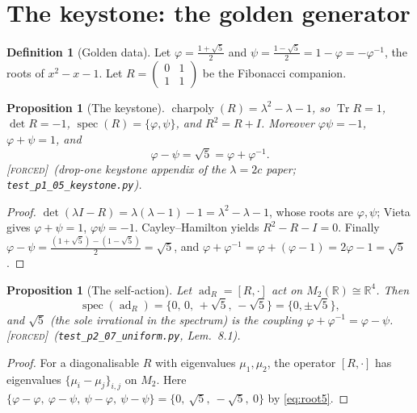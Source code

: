 \documentclass[11pt]{article}
\theoremstyle{plain}
\newtheorem{proposition}[theorem]{Proposition}
\theoremstyle{definition}
\newtheorem{definition}[theorem]{Definition}
\theoremstyle{remark}
\newcommand{\forced}{\textup{\textcolor{forcedc}{\textsc{[forced]}}}}
\newcommand{\R}{\mathbb{R}}
\newcommand{\tr}{\operatorname{Tr}}
\newcommand{\adR}{\operatorname{ad}_R}
\begin{document}
\section{The keystone: the golden generator}\label{sec:keystone}

\begin{definition}[Golden data]\label{def:golden}
Let $\varphi=\tfrac{1+\sqrt5}{2}$ and $\psi=\tfrac{1-\sqrt5}{2}=1-\varphi=-\varphi^{-1}$, the roots of
$x^2-x-1$. Let $R=\left(\begin{smallmatrix}0&1\\1&1\end{smallmatrix}\right)$ be the Fibonacci companion.
\end{definition}

\begin{proposition}[The keystone]\label{prop:keystone}
$\operatorname{charpoly}(R)=\lambda^2-\lambda-1$, so $\tr R=1$, $\det R=-1$, $\operatorname{spec}(R)=\{\varphi,\psi\}$,
and $R^2=R+I$. Moreover $\varphi\psi=-1$, $\varphi+\psi=1$, and
\begin{equation}\label{eq:root5}
\varphi-\psi=\sqrt5=\varphi+\varphi^{-1}.
\end{equation}
\forced\ (drop-one keystone appendix of the $\lambda=2c$ paper; \texttt{test\_p1\_05\_keystone.py}).
\end{proposition}
\begin{proof}
$\det(\lambda I-R)=\lambda(\lambda-1)-1=\lambda^2-\lambda-1$, whose roots are $\varphi,\psi$; Vieta gives
$\varphi+\psi=1$, $\varphi\psi=-1$. Cayley--Hamilton yields $R^2-R-I=0$. Finally
$\varphi-\psi=\tfrac{(1+\sqrt5)-(1-\sqrt5)}{2}=\sqrt5$, and $\varphi+\varphi^{-1}=\varphi+(\varphi-1)=2\varphi-1=\sqrt5$.
\end{proof}

\begin{proposition}[The self-action]\label{prop:selfaction}
Let $\adR=[R,\cdot]$ act on $M_2(\R)\cong\R^4$. Then
\begin{equation}\label{eq:adspec}
\operatorname{spec}(\adR)=\{0,\,0,\,+\sqrt5,\,-\sqrt5\}=\{0,\pm\sqrt5\},
\end{equation}
and $\sqrt5$ (the sole irrational in the spectrum) is the \emph{coupling}
$\varphi+\varphi^{-1}=\varphi-\psi$. \forced\ (\texttt{test\_p2\_07\_uniform.py}, Lem.~8.1).
\end{proposition}
\begin{proof}
For a diagonalisable $R$ with eigenvalues $\mu_1,\mu_2$, the operator $[R,\cdot]$ has eigenvalues
$\{\mu_i-\mu_j\}_{i,j}$ on $M_2$. Here $\{\varphi-\varphi,\ \varphi-\psi,\ \psi-\varphi,\ \psi-\psi\}
=\{0,\ \sqrt5,\ -\sqrt5,\ 0\}$ by \eqref{eq:root5}.
\end{proof}
\end{document}
